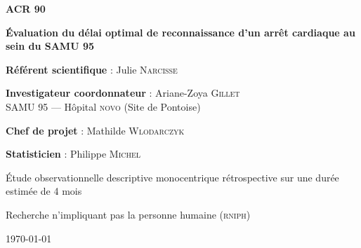 %
\raggedright
\thispagestyle{empty}

\begin{tcolorbox}[colback=novo!5,
                  colframe=novo]
\begin{center}
\textbf{\textcolor{novo}{\Huge ACR 90}}
\end{center}
\end{tcolorbox}


\bigskip
\begin{center}
\textbf{\Large Évaluation du délai optimal de reconnaissance d’un arrêt cardiaque au sein du SAMU 95}
\end{center}


\begin{center}
\begin{minipage}{0.8\textwidth}
\begin{tcolorbox}[colback=novo!5,
                  colframe=novo]

\textbf{Référent scientifique} : \mme Julie  \textsc{Narcisse}
\bigskip

\textbf{Investigateur coordonnateur} : \doc Ariane-Zoya  \textsc{Gillet}\\
SAMU 95  --- Hôpital \textsc{novo} (Site de Pontoise)

\bigskip

\bigskip

\textbf{Chef de projet} : \mme Mathilde  \textsc{Wlodarczyk}

\bigskip



\textbf{Statisticien} : \doc Philippe \textsc{Michel}

\end{tcolorbox}
\end{minipage}
\end{center}


Étude observationnelle descriptive monocentrique rétrospective sur une durée
estimée de 4 mois

Recherche n’impliquant pas la personne humaine (\textsc{rniph})


\begin{flushright}
\today
\end{flushright}
